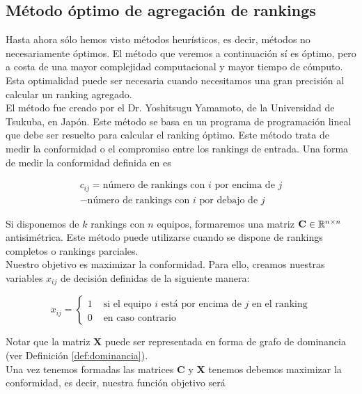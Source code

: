 \subsection{Método óptimo de agregación de rankings}

Hasta ahora sólo hemos visto métodos heurísticos, es decir, métodos no necesariamente óptimos. El método que veremos a continuación sí es óptimo, pero a costa de una mayor complejidad computacional y mayor tiempo de cómputo. Esta optimalidad puede ser necesaria cuando necesitamos una gran precisión al calcular un ranking agregado.\\

El método fue creado por el Dr. Yoshitsugu Yamamoto, de la Universidad de Tsukuba, en Japón. Este método se basa en un programa de programación lineal que debe ser resuelto para calcular el ranking óptimo. Este método trata de medir la conformidad o el compromiso entre los rankings de entrada. Una forma de medir la conformidad definida en \cite{langville2012s} es

\begin{multline} \label{eq:conformidad}
c_{ij} = \text{número de rankings con $i$ por encima de $j$} \\ - \text{número de rankings con $i$ por debajo de $j$}
\end{multline}

Si disponemos de $k$ rankings con $n$ equipos, formaremos una matriz $\mathbf{C} \in \mathbb{R}^{n\times n}$ antisimétrica. Este método puede utilizarse cuando se dispone de rankings completos o rankings parciales.\\

Nuestro objetivo es maximizar la conformidad. Para ello, creamos nuestras variables $x_{ij}$ de decisión definidas de la siguiente manera:

\begin{equation}
x_{ij} = \begin{cases}
1 & \text{ si el equipo $i$ está por encima de $j$ en el ranking}\\
0 & \text{ en caso contrario}
\end{cases}
\end{equation}

Notar que la matriz $\mathbf{X}$ puede ser representada en forma de grafo de dominancia (ver Definición \ref{def:dominancia}).\\

Una vez tenemos formadas las matrices $\mathbf{C}$ y $\mathbf{X}$ tenemos debemos maximizar la conformidad, es decir, nuestra función objetivo será

